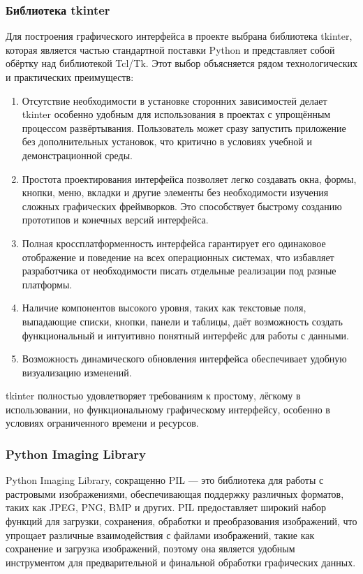 \subsubsection{Библиотека tkinter}

Для построения графического интерфейса в проекте выбрана библиотека tkinter, которая является частью стандартной поставки Python и представляет собой обёртку над библиотекой Tcl/Tk. Этот выбор объясняется рядом технологических и практических преимуществ:
\begin{enumerate}
	\item Отсутствие необходимости в установке сторонних зависимостей делает tkinter особенно удобным для использования в проектах с упрощённым процессом развёртывания. Пользователь может сразу запустить приложение без дополнительных установок, что критично в условиях учебной и демонстрационной среды.
	\item Простота проектирования интерфейса позволяет легко создавать окна, формы, кнопки, меню, вкладки и другие элементы без необходимости изучения сложных графических фреймворков. Это способствует быстрому созданию прототипов и конечных версий интерфейса.
	\item Полная кроссплатформенность интерфейса гарантирует его одинаковое отображение и поведение на всех операционных системах, что избавляет разработчика от необходимости писать отдельные реализации под разные платформы.
	\item Наличие компонентов высокого уровня, таких как текстовые поля, выпадающие списки, кнопки, панели и таблицы, даёт возможность создать функциональный и интуитивно понятный интерфейс для работы с данными.
	\item Возможность динамического обновления интерфейса обеспечивает удобную визуализацию изменений.
\end{enumerate}

tkinter полностью удовлетворяет требованиям к простому, лёгкому в использовании, но функциональному графическому интерфейсу, особенно в условиях ограниченного времени и ресурсов.	

\subsubsection{Python Imaging Library}

Python Imaging Library, сокращенно PIL — это библиотека для работы с растровыми изображениями, обеспечивающая поддержку различных форматов, таких как JPEG, PNG, BMP и других. PIL предоставляет широкий набор функций для загрузки, сохранения, обработки и преобразования изображений, что упрощает различные взаимодействия с файлами изображений, такие как сохранение и загрузка изображений, поэтому она является удобным инструментом для предварительной и финальной обработки графических данных.




